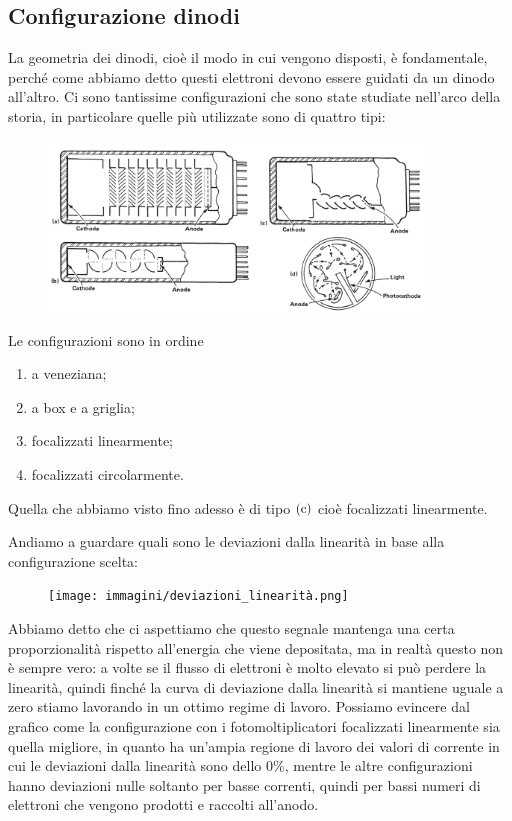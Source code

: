\subsection{Configurazione dinodi}
La geometria dei dinodi, cioè il modo in cui vengono disposti, è fondamentale, perché come abbiamo detto questi elettroni devono essere guidati da un dinodo all'altro. Ci sono tantissime configurazioni che sono state studiate nell'arco della storia, in particolare quelle più utilizzate sono di quattro tipi:
\begin{figure}[H]
   \centering
   \includegraphics[width=0.9\textwidth]{immagini/geometrie_dinodi.png}
\end{figure}
Le configurazioni sono in ordine
\begin{enumerate}[label=(\alph*)]
   \item a veneziana;
   \item a box e a griglia;
   \item focalizzati linearmente;
   \item focalizzati circolarmente.
\end{enumerate}
Quella che abbiamo visto fino adesso è di tipo $\rm (c)$ cioè focalizzati linearmente.

Andiamo a guardare quali sono le deviazioni dalla linearità in base alla configurazione scelta:
\begin{figure}[H]
   \centering
   \texttt{[image: immagini/deviazioni\_linearità.png]}
\end{figure}
Abbiamo detto che ci aspettiamo che questo segnale mantenga una certa proporzionalità rispetto all'energia che viene depositata, ma in realtà questo non è sempre vero: a volte se il flusso di elettroni è molto elevato si può perdere la linearità, quindi finché la curva di deviazione dalla linearità si mantiene uguale a zero stiamo lavorando in un ottimo regime di lavoro. Possiamo evincere dal grafico come la configurazione con i fotomoltiplicatori focalizzati linearmente sia quella migliore, in quanto ha un'ampia regione di lavoro dei valori di corrente in cui le deviazioni dalla linearità sono dello $0\%$, mentre le altre configurazioni hanno deviazioni nulle soltanto per basse correnti, quindi per bassi numeri di elettroni che vengono prodotti e raccolti all'anodo.

